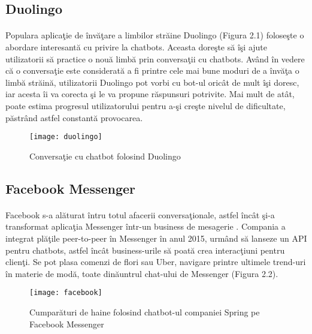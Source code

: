 \subsection{Duolingo}

\paragraph{}
Populara aplica\c tie de \^ inv\u a\c tare a limbilor str\u aine Duolingo \cite{duolingo} (Figura 2.1) folose\c ste o abordare interesant\u a cu privire la chatbots. Aceasta dore\c ste s\u a \^ i\c si ajute utilizatorii s\u a practice o nou\u a limb\u a prin conversa\c tii cu chatbots. Av\^ and \^ in vedere c\u a o conversa\c tie este considerat\u a a fi printre cele mai bune moduri de a \^ inv\u a\c ta o limb\u a str\u ain\u a, utilizatorii Duolingo pot vorbi cu bot-ul oric\^ at de mult \^ i\c si doresc, iar acesta \^ ii va corecta \c si le va propune r\u aspunsuri potrivite. Mai mult de at\^ at, poate estima progresul utilizatorului pentru a-\c si cre\c ste nivelul de dificultate, p\u astr\^ and astfel constant\u a provocarea.

\begin{figure}[H]
\centering
\texttt{[image: duolingo]}
\caption{Conversa\c tie cu chatbot folosind Duolingo}
\end{figure}

\subsection{Facebook Messenger}

\paragraph{}
Facebook s-a al\u aturat \^ intru totul afacerii conversa\c tionale, astfel \^ inc\^ at \c si-a transformat aplica\c tia Messenger \^ intr-un business de mesagerie \cite{facebook-messenger}. Compania a integrat pl\u a\c tile peer-to-peer \^ in Messenger \^ in anul 2015, urm\^ and s\u a lanseze un API pentru chatbots, astfel \^ inc\^ at business-urile s\u a poat\u a crea interac\c tiuni pentru clien\c ti. Se pot plasa comenzi de flori sau Uber, navigare printre ultimele trend-uri \^ in materie de mod\u a,  toate din\u auntrul chat-ului de Messenger (Figura 2.2).

\begin{figure}[H]
\centering
\texttt{[image: facebook]}
\caption{Cumpar\u aturi de haine folosind chatbot-ul companiei Spring pe Facebook Messenger}
\end{figure}


